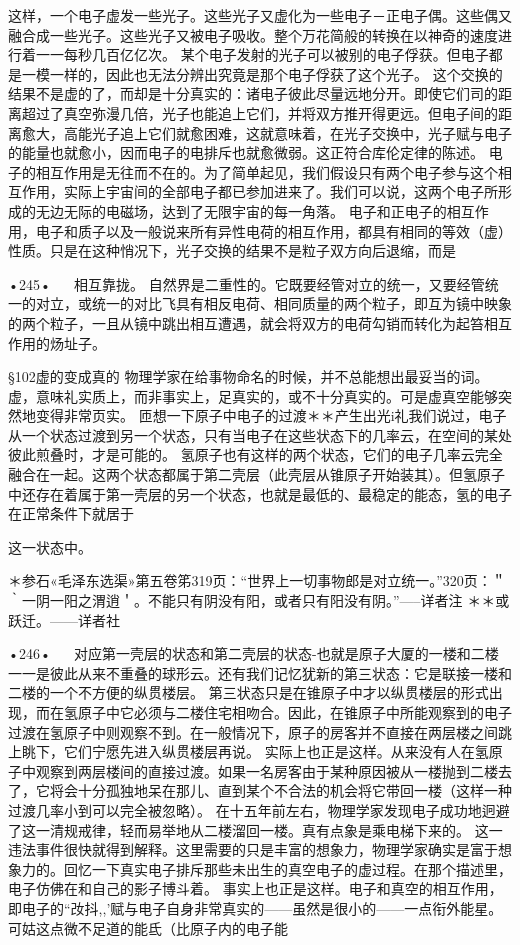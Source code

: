 这样，一个电子虚发一些光子。这些光子又虚化为一些电子－正电子偶。这些偶又融合成一些光子。这些光子又被电子吸收。整个万花简般的转换在以神奇的速度进行着一一每秒几百亿亿次。
某个电子发射的光子可以被别的电子俘获。但电子都是一模一样的，因此也无法分辨出究竟是那个电子俘获了这个光子。
这个交换的结果不是虚的了，而却是十分真实的：诸电子彼此尽量远地分开。即使它们司的距离超过了真空弥漫几倍，光子也能追上它们，并将双方推开得更远。但电子间的距离愈大，高能光子追上它们就愈困难，这就意味着，在光子交换中，光子赋与电子的能量也就愈小，因而电子的电排斥也就愈微弱。这正符合库伦定律的陈述。
电子的相互作用是无往而不在的。为了简单起见，我们假设只有两个电子参与这个相互作用，实际上宇宙间的全部电子都已参加进来了。我们可以说，这两个电子所形成的无边无际的电磁场，达到了无限宇宙的每一角落。
电子和正电子的相互作用，电子和质子以及一般说来所有异性电荷的相互作用，都具有相同的等效（虚）性质。只是在这种悄况下，光子交换的结果不是粒子双方向后退缩，而是

•245•
  
相互靠拢。
自然界是二重性的。它既要经管对立的统一，又要经管统一的对立，或统一的对比飞具有相反电荷、相同质量的两个粒子，即互为镜中映象的两个粒子，一且从镜中跳出相互遭遇，就会将双方的电荷勾销而转化为起笞相互作用的炀址子。

§102虚的变成真的
物理学家在给事物命名的时候，并不总能想出最妥当的词。虚，意味礼实质上，而非事实上，足真实的，或不十分真实的。可是虚真空能够突然地变得非常页实。
匝想一下原子中电子的过渡＊＊产生出光i礼我们说过，电子从一个状态过渡到另一个状态，只有当电子在这些状态下的几率云，在空间的某处彼此煎叠时，才是可能的。
氢原子也有这样的两个状态，它们的电子几率云完全融合在一起。这两个状态都属于第二壳层（此壳层从锥原子开始装其）。但氢原子中还存在着属于第一壳层的另一个状态，也就是最低的、最稳定的能态，氢的电子在正常条件下就居于

这一状态中。

＊参石«毛泽东选渠»第五卷笫319页：“世界上一切事物郎是对立统一。”320页：＂｀一阴一阳之渭逍＇。不能只有阴没有阳，或者只有阳没有阴。”-----详者注
＊＊或跃迁。——详者社

•246•
  
对应第一壳层的状态和第二壳层的状态-也就是原子大厦的一楼和二楼一一是彼此从来不重叠的球形云。还有我们记忆犹新的第三状态：它是联接一楼和二楼的一个不方便的纵贯楼层。
第三状态只是在锥原子中才以纵贯楼层的形式出现，而在氢原子中它必须与二楼住宅相吻合。因此，在锥原子中所能观察到的电子过渡在氢原子中则观察不到。在一般情况下，原子的房客并不直接在两层楼之间跳上眺下，它们宁愿先进入纵贯楼层再说。
实际上也正是这样。从来没有人在氢原子中观察到两层楼间的直接过渡。如果一名房客由于某种原因被从一楼抛到二楼去了，它将会十分孤独地呆在那儿、直到某个不合法的机会将它带回一楼（这样一种过渡几率小到可以完全被忽略）。
在十五年前左右，物理学家发现电子成功地迥避了这一清规戒律，轻而易举地从二楼溜回一楼。真有点象是乘电梯下来的。
这一违法事件很快就得到解释。这里需要的只是丰富的想象力，物理学家确实是富于想象力的。回忆一下真实电子排斥那些未出生的真空电子的虚过程。在那个描述里，电子仿佛在和自己的影子博斗着。
事实上也正是这样。电子和真空的相互作用，即电子的“妀抖,,'赋与电子自身非常真实的——虽然是很小的——一点衔外能星。可姑这点微不足道的能氐（比原子内的电子能

